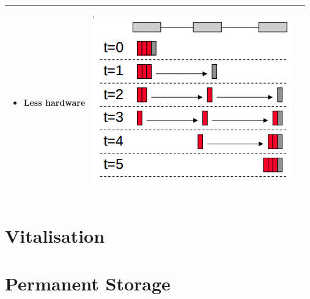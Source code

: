 \begin{center}
\begin{tabular}{| m{2cm} | m{5cm} | c |}
\begin{itemize}
      \item Less hardware
    \end{itemize} & 
    \begin{minipage}{.3\textwidth}
      \begin{center}
        \includegraphics[width=0.5\linewidth]{images/wormhole}
      \end{center}
    \end{minipage} \\ \hline
  \end{tabular}
\end{center}

\section{Vitalisation}

\section{Permanent Storage}
